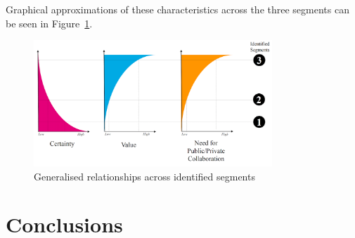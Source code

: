 \documentclass[b5paper,10pt]{article}
\begin{document}
Graphical approximations of these characteristics across the three
segments can be seen in Figure~\ref{fig:segmentcharacteristics}.

\begin{figure}[!ht]
\centering
\includegraphics[width=0.8\textwidth]{images/segmentcharacteristics.png}
\caption{Generalised relationships across identified segments}
\label{fig:segmentcharacteristics}
\end{figure}




 


\section{Conclusions}\label{conclusion}
\end{document}
